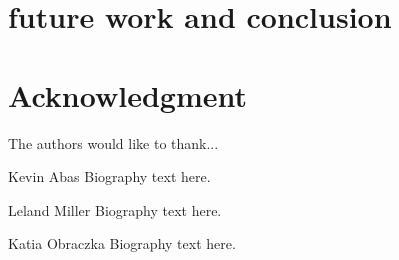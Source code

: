 \documentclass[10pt,conference]{IEEEtran}
\begin{document}
\section{future work and conclusion}






\section*{Acknowledgment}


The authors would like to thank...


\ifCLASSOPTIONcaptionsoff
  \newpage
\fi






{}








\begin{IEEEbiographynophoto}{Kevin Abas}
Biography text here.
\end{IEEEbiographynophoto}

\begin{IEEEbiographynophoto}{Leland Miller}
Biography text here.
\end{IEEEbiographynophoto}

\begin{IEEEbiographynophoto}{Katia Obraczka}
Biography text here.
\end{IEEEbiographynophoto}



\end{document}
